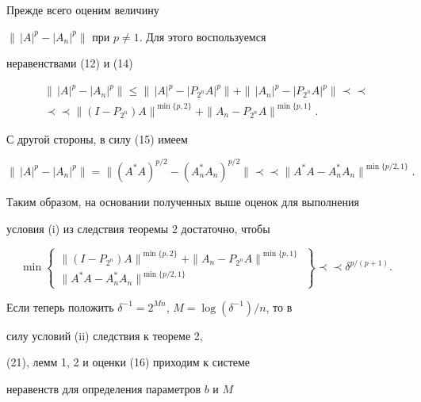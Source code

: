 \begin{pf} Прежде всего оценим величину


$\|\,|A|^p-|A_n|^p\|$ при $p\ne 1$. Для этого воспользуемся


неравенствами (12) и (14)


\begin{multline*}


\|\,|A|^p-|A_n|^p\| \le \|\,|A|^p-|P_{2^n}A|^p\| +


\|\,|A_n|^p-|P_{2^n}A|^p\| \prec\prec \\


\prec\prec \|(I-P_{2^n})A\|^{\min\{p,2\}} +


\|A_n-P_{2^n}A\|^{\min\{p,1\}}.


\end{multline*}


С другой стороны, в силу (15) имеем


$$


\|\,|A|^p-|A_n|^p\| = \|(A^*A)^{p/2}-(A^*_nA_n)^{p/2}\|


\prec\prec \|A^*A-A^*_nA_n\|^{\min\{p/2,1\}} .


$$


Таким образом, на основании полученных выше оценок для выполнения


условия (i) из следствия теоремы 2 достаточно, чтобы


\begin{equation}


\min \left\{


\begin{matrix}


\|(I-P_{2^n})A\|^{\min\{p,2\}} +


\|A_n-P_{2^n}A\|^{\min\{p,1\}} \\


\|A^*A-A^*_nA_n\|^{\min\{p/2,1\}}


\end{matrix}


\right\}


\prec\prec \delta^{p/(p+1)}.


\end{equation}


Если теперь положить $\delta^{-1}=2^{Mn}$, $M=\log(\delta^{-1})/n$, то в


силу условий (ii) следствия к теореме 2,


(21), лемм 1, 2 и оценки (16) приходим к системе


неравенств для определения параметров $b$ и $M$



\end{pf}
